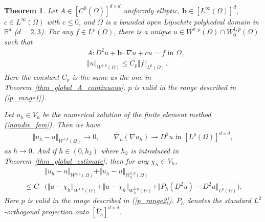\documentclass[12pt]{amsart}
\newtheorem{theorem}{Theorem}[section]
\theoremstyle{definition}
\theoremstyle{remark}
\begin{document}
\begin{theorem}
\label{thm_A_continuous_complete}
Let $A \in [C^{0}(\overline{\Omega})]^{d\times d}$ uniformly elliptic, 
$\boldsymbol{b}\in [L^{\infty}(\Omega)]^{d}$, $c \in L^{\infty}(\Omega)$ with $c \leq 0$, 
 and $\Omega$ is a bounded open Lipschitz polyhedral domain in $\mathbb{R}^{d}$ ($d=2,3$).  
For any $f \in L^{p}(\Omega)$, 
there is a unique $u \in W^{2,p}(\Omega) \cap W_{0}^{1,p}(\Omega)$ such that 
\begin{subequations}
\label{A_continuous_wellposedness_props}
\begin{align}
\label{A_continuous_wellposedness_prop1}
& A:D^{2} u + \boldsymbol{b}\cdot \nabla u + cu = f \text{ in } \Omega, \\
\label{A_continuous_wellposedness_prop2}
& \Vert u\Vert_{W^{2,p}(\Omega)} \leq C_{p} \Vert f \Vert_{L^{p}(\Omega)}.
\end{align}
\end{subequations}
Here the constant $C_{p}$ is the same as the one in Theorem~\ref{thm_global_A_continuous}. 
$p$ is valid in the range described in (\ref{p_range1}).

Let $u_{h} \in V_{h}$ be the numerical solution of the finite element method 
(\ref{nondiv_fem}). Then we have 
\begin{align}
\label{A_continuous_conv}
\Vert u_{h} -  u \Vert_{W^{1,p}(\Omega)} \rightarrow 0, \qquad 
\overline{\nabla}_{h}(\nabla u_{h}) \rightharpoonup D^{2}u \text{ in } 
[L^{p}(\Omega)]^{d \times d},
\end{align}
as $h \rightarrow 0$. 
And if $h \in (0,h_{2})$ where $h_{2}$ is introduced in Theorem~\ref{thm_global_estimate}, then for any 
$\chi_{h} \in V_{h}$,
\begin{align}
\label{A_continuous_conv_rate}
& \Vert u_{h} - u \Vert_{W^{1,p}(\Omega)}
+ \Vert u_{h} - u \Vert_{W_{h}^{2,p}(\Omega)} \\
\nonumber
\leq C & \big( \Vert u  - \chi_{h} \Vert_{W^{1,p}(\Omega)} + \Vert u - \chi_{h}\Vert_{W_{h}^{2,p}(\Omega)} 
+ \Vert \overline{P}_{h}(D^{2}u) - D^{2}u \Vert_{L^{p}(\Omega)} \big).
\end{align}
Here $p$ is valid in the range described in (\ref{p_range2}). 
$\overline{P}_{h}$ denotes the standard $L^{2}$-orthogonal projection onto $[\overline{V}_{h}]^{d\times d}$.
\end{theorem}
\end{document}
